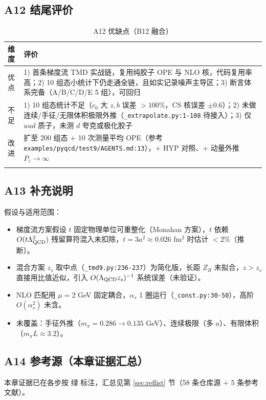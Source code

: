 \documentclass[UTF8]{ctexart}
\begin{document}
\subsection{A12 结尾评价}
\tiny
\begin{xltabular}{\textwidth}{lX}
\toprule
维度 & 评价 \\
\midrule
\endhead
优点 & 1) 首条梯度流 TMD 实战链，复用纯胶子 OPE 与 NLO 核，代码复用率高；2) 10 组态小统计下仍走通全链，且如实记录噪声主导区；3) 断言体系完备（A/B/C/D/E 5 组），可回归 \\
不足 & 1) 10 组态统计不足（$c_0$ 大 $z,b$ 误差 $>100\%$，CS 核误差 $\pm0.6$）；2) 未做连续/手征/无限体积极限外推（\texttt{\nolinkurl{\_extrapolate.py:1-108}} 待接入）；3) 仅 $uud$ 质子，未测 $d$ 夸克或极化胶子 \\
改进 & 扩至 200 组态 $+$ 10 次测量平均 OPE（参考 \texttt{\nolinkurl{examples/pyqcd/test9/AGENTS.md:13}}），$+$ HYP 对照、$+$ 动量外推 $P_z\to\infty$ \\
\bottomrule
\caption{A12 优缺点（B12 融合）}
\end{xltabular}

\subsection{A13 补充说明}
\label{sec:a13}
假设与适用范围：
\begin{itemize}
\item 梯度流方案假设 $t$ 固定物理单位可重整化（Monahan 方案），$t$ 依赖 $O(t\Lambda_{\rm QCD}^2)$ 残留算符混入未扣除，$t=3a^2\approx0.026$ fm$^2$ 时估计 $<2\%$（\textcolor{relation}{推断}）。
\item 混合方案 $z_s$ 取中点（\texttt{\nolinkurl{\_tmd9.py:236-237}}）为简化版，长距 $Z_R$ 未拟合，$z>z_s$ 直接用比值近似，引入 $O(\Lambda_{\rm QCD}z_s)^{-1}$ 系统误差（\textcolor{warn}{未验证}）。
\item NLO 匹配用 $\mu=2$ GeV 固定耦合，$\alpha_s$ 1 圈运行（\texttt{\nolinkurl{\_const.py:30-50}}），高阶 $O(\alpha_s^2)$ 未含。
\item 未覆盖：手征外推（$m_\pi=0.286\to0.135$ GeV）、连续极限（多 $a$）、有限体积（$m_\pi L\approx3.2$）。
\end{itemize}

\subsection{A14 参考源（本章证据汇总）}
本章证据已在各步按 \textcolor{evidence}{绿} 标注，汇总见第 \ref{sec:reflist} 节（58 条仓库源 $+$ 5 条参考文献）。
\end{document}
